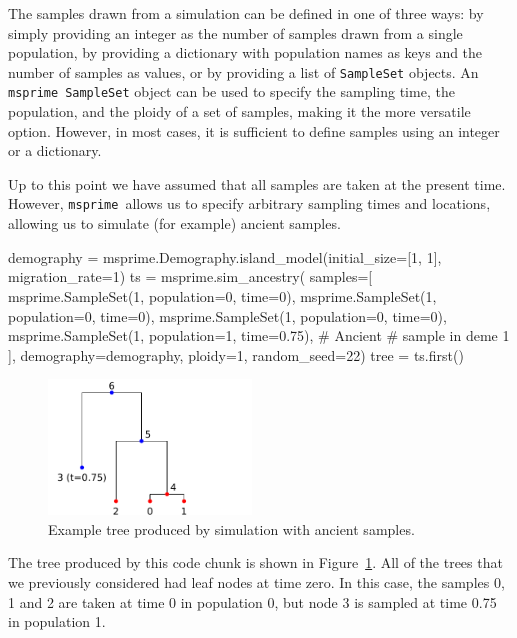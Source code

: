 \documentclass[graybox]{svmult}
\newcommand{\msprime}[0]{\texttt{msprime}}
\begin{document}
The samples drawn from a simulation can be defined in one of three ways: by
simply providing an integer as the number of samples drawn from a single population,
by providing a dictionary with population names as keys and the number of
samples as values, or by providing a list of \texttt{SampleSet} objects.
An \msprime\ \texttt{SampleSet} object can be used to specify the sampling
time, the population, and the ploidy of a set of samples, making it the more
versatile option. However, in most cases, it is sufficient to define samples
using an integer or a dictionary.

Up to this point we have assumed that all samples are taken at the
present time. However, \msprime\ allows us to specify arbitrary sampling
times and locations, allowing us to simulate (for example) ancient
samples.

\begin{pythoncode}
demography = msprime.Demography.island_model(initial_size=[1, 1],
                                             migration_rate=1)
ts = msprime.sim_ancestry(
    samples=[
        msprime.SampleSet(1, population=0, time=0),
        msprime.SampleSet(1, population=0, time=0),
        msprime.SampleSet(1, population=0, time=0),
        msprime.SampleSet(1, population=1, time=0.75), # Ancient
        # sample in deme 1
    ],
    demography=demography,
    ploidy=1,
    random_seed=22)
tree = ts.first()
\end{pythoncode}

\begin{figure}[t]
\centering
\includegraphics[width=0.48\textwidth]{images/plot_9.pdf}
\caption{\label{fig-tree-ancient-samples} Example tree produced by simulation
with ancient samples.}
\end{figure}

The tree produced by this code chunk is shown in Figure~\ref{fig-tree-ancient-samples}.
All of the trees that we previously considered had leaf nodes at time
zero. In this case, the samples 0, 1 and 2 are taken at time 0 in
population 0, but node 3 is sampled at time 0.75 in population 1.
\end{document}

